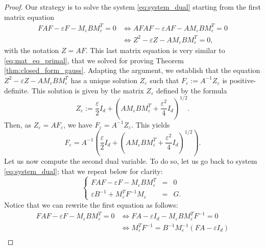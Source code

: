 \documentclass[]{article}
\numberwithin{equation}{section}
\theoremstyle{plain}
\begin{document}
{\begin{proof}
	Our strategy is to solve the system \eqref{eq:system_dual} starting from the first matrix equation 
	\begin{align*}
		FAF - \varepsilon F - M_{\varepsilon}BM_{\varepsilon}^T= 0 & \Leftrightarrow  AFAF - \varepsilon AF - AM_{\varepsilon}BM_{\varepsilon}^T= 0 \\
		& \Leftrightarrow Z^2 - \varepsilon Z - AM_{\varepsilon}BM_{\varepsilon}^T= 0, 
	\end{align*}
	with the notation $Z = AF$. This last matrix equation is very similar to \eqref{eq:mat_eq_primal}, that we solved for proving Theorem \ref{thm:closed_form_gauss}. Adapting the argument, we establish that the equation ${Z^2 - \varepsilon Z - AM_\varepsilon B M_\varepsilon^T}$ has a unique solution $Z_\varepsilon$ such that $F_\varepsilon := A^{-1}Z_\varepsilon$ is positive-definite. This solution is given by the matrix $Z_\varepsilon$ defined by the formula
	\begin{equation*}
		Z_\varepsilon :=\frac{\varepsilon}{2}I_d+ \left(AM_{\varepsilon}BM_{\varepsilon}^T+ \frac{\varepsilon^2}{4}I_d  \right)^{1/2}.
	\end{equation*}
	Then, as $Z_{\varepsilon} = AF_\varepsilon$, we have $F_\varepsilon = A^{-1} Z_{\varepsilon}$. This yields 
	\begin{equation}\label{eq:inproof_solution_K}
		F_\varepsilon =  A^{-1}\left( \frac{\varepsilon}{2}I_d +\left(AM_{\varepsilon}BM_{\varepsilon}^T+ \frac{\varepsilon^2}{4}I_d  \right)^{1/2} \right).
	\end{equation}
	Let us now compute the second dual variable. To do so, let us go back to system \eqref{eq:system_dual}; that we repeat below for clarity:
	\begin{equation*}
		\left\{ 
		\begin{array}{ccc}
			FAF - \varepsilon F - M_{\varepsilon}BM_{\varepsilon}^T& = & 0 \\
			\varepsilon B^{-1} + M_\varepsilon^TF^{-1}M_{\varepsilon}& = & G.
		\end{array}
		\right.
	\end{equation*}
	Notice that we can rewrite the first equation as follows:
	\begin{align*}
		FAF - \varepsilon F - M_{\varepsilon}BM_{\varepsilon}^T= 0 & \Leftrightarrow  FA - \varepsilon I_d - M_{\varepsilon}BM_\varepsilon^TF^{-1} = 0 \\
		& \Leftrightarrow  M_\varepsilon^T F^{-1} = B^{-1}M_{\varepsilon}^{-1}(FA - \varepsilon I_d) \\

\end{align*}
\end{proof}}
\end{document}
